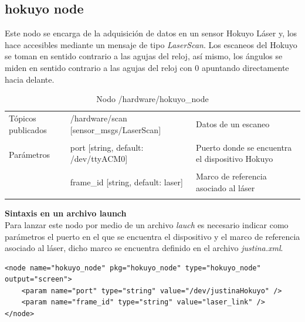 \documentclass[a4paper,usenames,dvipsnames,svgnames,table]{book}
\begin{document}
\subsection{hokuyo node}
Este nodo se encarga de la adquisición de datos en un sensor Hokuyo Láser y, los hace accesibles mediante un mensaje de tipo \textit{LaserScan}. Los escaneos del Hokuyo se toman en sentido contrario a las agujas del reloj, así mismo, los ángulos se miden en sentido contrario a las agujas del reloj con 0 apuntando directamente hacia delante.
\begin{table}[H]
\begin{center}
\begin{tabular}{|l|p{6.5cm}|p{4.5cm}|}%
\hline

Tópicos publicados
& /hardware/scan [sensor\_msgs/LaserScan] & Datos de un escaneo \\
& & \\
\hline

\multirow{2}{*}{Parámetros} 
&  port [string, default: /dev/ttyACM0] & Puerto donde se encuentra el dispositivo Hokuyo \\
& & \\
& frame\_id [string, default: laser]  & Marco de referencia asociado al láser \\
& & \\
\cline{1-3}

\end{tabular}
\caption{Nodo /hardware/hokuyo\_node}
\label{hokuyo node}
\end{center}
\end{table}

\textbf{Sintaxis en un archivo launch}\\
Para lanzar este nodo por medio de un archivo \textit{lauch} es necesario indicar como parámetros el puerto en el que se encuentra el dispositivo y el marco de referencia asociado al láser, dicho marco se encuentra definido en el archivo \textit{justina.xml}.\\
\begin{verbatim}
<node name="hokuyo_node" pkg="hokuyo_node" type="hokuyo_node" output="screen">
    <param name="port" type="string" value="/dev/justinaHokuyo" />
    <param name="frame_id" type="string" value="laser_link" />
</node>
\end{verbatim}

\end{document}
